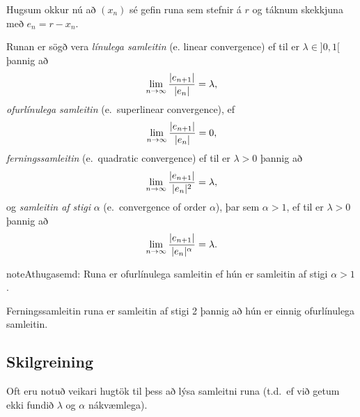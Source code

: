 \documentclass[A4paper,10pt,icelandic]{sphinxmanual}
\begin{document}
Hugsum okkur nú að \((x_n)\) sé gefin runa sem stefnir á \(r\)
og táknum skekkjuna með \(e_n=r-x_n\).

Runan er sögð vera \emph{línulega samleitin} (e. linear convergence) ef til
er \(\lambda\in ]0,1[\) þannig að
\begin{gather}
\begin{split}\lim_{n\to \infty}\dfrac{|e_{n+1}|}{|e_n|}=\lambda,\end{split}\notag
\end{gather}
\emph{ofurlínulega samleitin} (e. superlinear convergence), ef
\begin{gather}
\begin{split}\lim_{n\to \infty}\dfrac{|e_{n+1}|}{|e_n|}=0,\end{split}\notag
\end{gather}
\emph{ferningssamleitin} (e. quadratic convergence) ef til er \(\lambda>0\) þannig að
\begin{gather}
\begin{split}\lim_{n\to \infty}\dfrac{|e_{n+1}|}{|e_n|^2}=\lambda,\end{split}\notag
\end{gather}
og \emph{samleitin af stigi} \(\alpha\) (e. convergence of order
\(\alpha\)), þar sem \(\alpha> 1\), ef til er \(\lambda>0\)
þannig að
\begin{gather}
\begin{split}\lim_{n\to \infty}\dfrac{|e_{n+1}|}{|e_n|^\alpha}=\lambda.\end{split}\notag
\end{gather}
\begin{notice}{note}{Athugasemd:}
Runa er ofurlínulega samleitin ef hún er samleitin af stigi \(\alpha>1\).

Ferningssamleitin runa er samleitin af stigi 2 þannig að hún er einnig ofurlínulega samleitin.
\end{notice}


\subsection{Skilgreining}
\label{kafli01:skilgreining}
Oft eru notuð veikari hugtök til þess að lýsa samleitni runa (t.d. ef
við getum ekki fundið \(\lambda\) og \(\alpha\) nákvæmlega).
\end{document}
